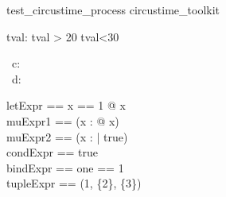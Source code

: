 \begin{zsection}
   \SECTION test\_circustime\_process \parents circustime\_toolkit
\end{zsection}

\begin{axdef}
   tval: \nat
\where
   tval > 20 \land tval<30
\end{axdef}

\begin{circus}
     \circchannel\ c: \nat \\
     \circchannel\ d: \nat \\
\end{circus}

\begin{zed}
  letExpr == \LET x == 1 @ x\\
  muExpr1 == (\mu x : \nat @ x)\\
  muExpr2 == (\mu x : \nat | true)\\
  condExpr == \IF true  \\
  bindExpr == \lblot one == 1 \rblot\\
  tupleExpr == (1, \{2\}, \power \{3\})\\
\end{zed}

